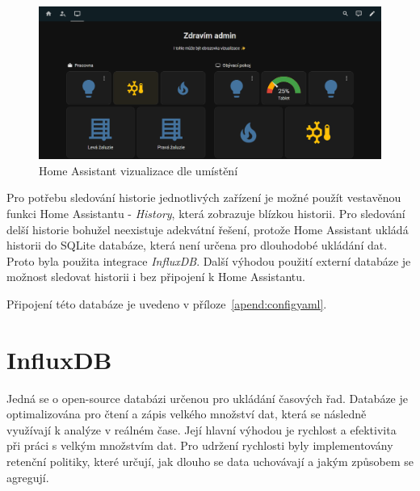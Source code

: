 \begin{figure}[!ht]
    \begin{center}
        \includegraphics[scale=0.35]{obrazky/Dashboard3.png}
    \end{center}
    \caption[Home Assistant vizualizace dle umístění]{Home Assistant vizualizace dle umístění}
    \label{fig:HAvisu3}
\end{figure}

Pro potřebu sledování historie jednotlivých zařízení je možné použít vestavěnou funkci Home Assistantu - \textit{History}, která zobrazuje blízkou historii. Pro sledování delší historie bohužel neexistuje adekvátní řešení, protože Home Assistant ukládá historii do SQLite databáze, která není určena pro dlouhodobé ukládání dat. Proto byla použita integrace \textit{InfluxDB}. Další výhodou použití externí databáze je možnost sledovat historii i bez připojení k Home Assistantu. 

Připojení této databáze je uvedeno v příloze~\ref{apend:configyaml}.
\section{InfluxDB}
Jedná se o open-source databázi určenou pro ukládání časových řad. Databáze je optimalizována pro čtení a zápis velkého množství dat, která se následně využívají k analýze v reálném čase. Její hlavní výhodou je rychlost a efektivita při práci s velkým množstvím dat. Pro udržení rychlosti byly implementovány retenční politiky, které určují, jak dlouho se data uchovávají a jakým způsobem se agregují. \cite{InfluxDB} \newline

